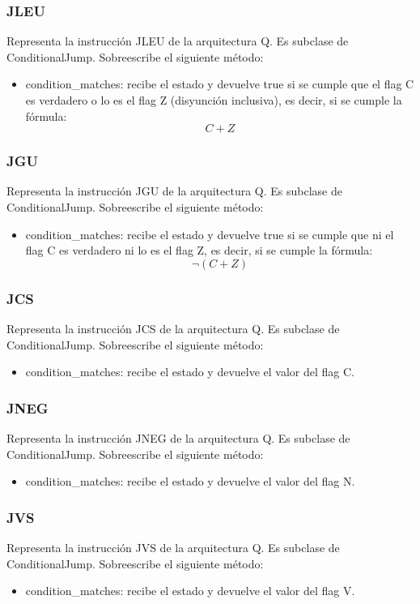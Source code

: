 \subsubsection{JLEU}
Representa la instrucción JLEU de la arquitectura Q. Es subclase de ConditionalJump. Sobreescribe el siguiente método:
\begin{itemize}
\item condition\_matches: recibe el estado y devuelve true si se cumple que el flag C es verdadero o lo es el flag Z (disyunción inclusiva), es decir, si se cumple la fórmula: \[C + Z \]
\end{itemize}

\subsubsection{JGU}
Representa la instrucción JGU de la arquitectura Q. Es subclase de ConditionalJump. Sobreescribe el siguiente método:
\begin{itemize}
\item condition\_matches: recibe el estado y devuelve true si se cumple que ni el flag C es verdadero ni lo es el flag Z, es decir, si se cumple la fórmula: \[\neg(C + Z) \]
\end{itemize}

\subsubsection{JCS}
Representa la instrucción JCS de la arquitectura Q. Es subclase de ConditionalJump. Sobreescribe el siguiente método:
\begin{itemize}
\item condition\_matches: recibe el estado y devuelve el valor del flag C.
\end{itemize}

\subsubsection{JNEG}
Representa la instrucción JNEG de la arquitectura Q. Es subclase de ConditionalJump. Sobreescribe el siguiente método:
\begin{itemize}
\item condition\_matches: recibe el estado y devuelve el valor del flag N.
\end{itemize}

\subsubsection{JVS}
Representa la instrucción JVS de la arquitectura Q. Es subclase de ConditionalJump. Sobreescribe el siguiente método:
\begin{itemize}
\item condition\_matches: recibe el estado y devuelve el valor del flag V.
\end{itemize}






